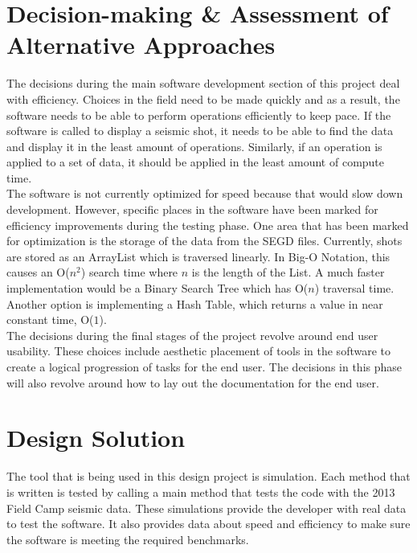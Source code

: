 \documentclass[12pt]{article}
\begin{document}
\section{Decision-making \& Assessment of Alternative Approaches}

The decisions during the main software development section of this project deal with efficiency. Choices in the field need to be made quickly and as a result, the software needs to be able to perform operations efficiently to keep pace. If the software is called to display a seismic shot, it needs to be able to find the data and display it in the least amount of operations. Similarly, if an operation is applied to a set of data, it should be applied in the least amount of compute time. \\

The software is not currently optimized for speed because that would slow down development. However, specific places in the software have been marked for efficiency improvements during the testing phase. One area that has been marked for optimization is the storage of the data from the SEGD files. Currently, shots are stored as an ArrayList which is traversed linearly. In Big-O Notation, this causes an O($n^2$) search time where $n$ is the length of the List. A much faster implementation would be a Binary Search Tree which has O($n$) traversal time. Another option is implementing a Hash Table, which returns a value in near constant time, O($1$). \\

The decisions during the final stages of the project revolve around end user usability. These choices include aesthetic placement of tools in the software to create a logical progression of tasks for the end user. The decisions in this phase will also revolve around how to lay out the documentation for the end user.

\section{Design Solution}

The tool that is being used in this design project is simulation. Each method that is written is tested by calling a main method that tests the code with the 2013 Field Camp seismic data. These simulations provide the developer with real data to test the software. It also provides data about speed and efficiency to make sure the software is meeting the required benchmarks. \\
\end{document}
